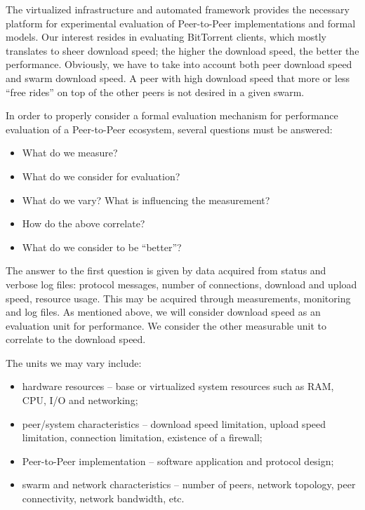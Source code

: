 The virtualized infrastructure and automated framework provides the necessary
platform for experimental evaluation of Peer-to-Peer implementations and
formal models. Our interest resides in evaluating BitTorrent clients, which
mostly translates to sheer download speed; the higher the download speed, the
better the performance. Obviously, we have to take into account both peer
download speed and swarm download speed. A peer with high download speed that
more or less ``free rides'' on top of the other peers is not desired in a
given swarm.

In order to properly consider a formal evaluation mechanism for performance
evaluation of a Peer-to-Peer ecosystem, several questions must be answered:

\begin{itemize}
  \item What do we measure?
  \item What do we consider for evaluation?
  \item What do we vary? What is influencing the measurement?
  \item How do the above correlate?
  \item What do we consider to be ``better''?
\end{itemize}

The answer to the first question is given by data acquired from status and
verbose log files: protocol messages, number of connections, download and
upload speed, resource usage. This may be acquired through measurements,
monitoring and log files. As mentioned above, we will consider download speed
as an evaluation unit for performance. We consider the other measurable unit
to correlate to the download speed.

The units we may vary include:

\begin{itemize}
  \item hardware resources -- base or virtualized system resources such as
  RAM, CPU, I/O and networking;
  \item peer/system characteristics -- download speed limitation, upload speed
  limitation, connection limitation, existence of a firewall;
  \item Peer-to-Peer implementation -- software application and protocol
  design;
  \item swarm and network characteristics -- number of peers, network
  topology, peer connectivity, network bandwidth, etc.
\end{itemize}

